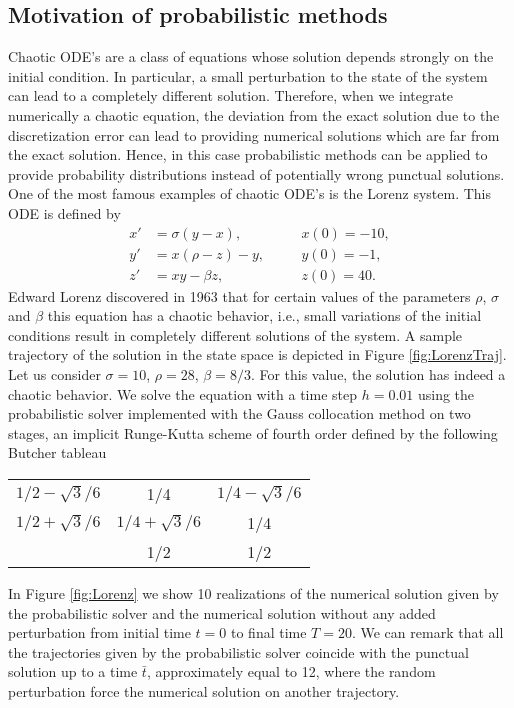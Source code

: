 \subsection{Motivation of probabilistic methods}\label{sec:probMotivation}

Chaotic ODE's are a class of equations whose solution depends strongly on the initial condition. In particular, a small perturbation to the state of the system can lead to a completely different solution. Therefore, when we integrate numerically a chaotic equation, the deviation from the exact solution due to the discretization error can lead to providing numerical solutions which are far from the exact solution. Hence, in this case probabilistic methods can be applied to provide probability distributions instead of potentially wrong punctual solutions.\\
One of the most famous examples of chaotic ODE's is the Lorenz system. This ODE is defined by
\begin{equation}\label{eq:Lorenz}
\begin{aligned}
x' &= \sigma(y - x), \quad &&x(0) = -10,\\
y' &= x(\rho - z) - y, \quad &&y(0) = -1,\\
z' &= xy - \beta z, \quad &&z(0) = 40.
\end{aligned}
\end{equation}
Edward Lorenz discovered in 1963 that for certain values of the parameters $\rho$, $\sigma$ and $\beta$ this equation has a chaotic behavior, i.e., small variations of the initial conditions result in completely different solutions of the system. A sample trajectory of the solution in the state space is depicted in Figure \ref{fig:LorenzTraj}. \\
Let us consider $\sigma = 10$, $\rho = 28$, $\beta = 8/3$. For this value, the solution has indeed a chaotic behavior. We solve the equation with a time step $h = 0.01$ using the probabilistic solver implemented with the Gauss collocation method on two stages, an implicit Runge-Kutta scheme of fourth order defined by the following Butcher tableau
\begin{center}
	\begin{tabular}{c|cc}
		$1/2-\sqrt{3}/6$ & 1/4 & $1/4-\sqrt{3}/6$ \\
		$1/2+\sqrt{3}/6$ & $1/4+\sqrt{3}/6$ & 1/4 \\
		\hline 
		& 1/2 & 1/2 
	\end{tabular}
\end{center} 
In Figure \ref{fig:Lorenz} we show 10 realizations of the numerical solution given by the probabilistic solver and the numerical solution without any added perturbation from initial time $t = 0$ to final time $T = 20$. We can remark that all the trajectories given by the probabilistic solver coincide with the punctual solution up to a time $\bar t$, approximately equal to 12, where the random perturbation force the numerical solution on another trajectory. 

